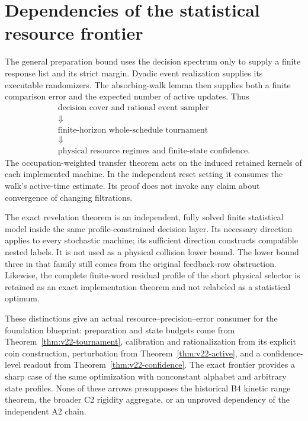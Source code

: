 \section{Dependencies of the statistical resource frontier}
\label{sec:v22-dependencies}
The general preparation bound uses the decision spectrum only to
supply a finite response list and its strict margin. Dyadic event
realization supplies its executable randomizers. The absorbing-walk
lemma then supplies both a finite comparison error and the expected
number of active updates. Thus
\[
 \begin{gathered}
 \text{decision cover and rational event sampler}\\
 \Downarrow\\
 \text{finite-horizon whole-schedule tournament}\\
 \Downarrow\\
 \text{physical resource regimes and finite-state confidence}.
 \end{gathered}
\]
The occupation-weighted transfer theorem acts on the induced retained
kernels of each implemented machine. In the independent reset setting
it consumes the walk's active-time estimate. Its proof does not invoke
any claim about convergence of changing filtrations.

The exact revelation theorem is an independent, fully solved finite
statistical model inside the same profile-constrained decision layer.
Its necessary direction applies to every stochastic machine; its
sufficient direction constructs compatible nested labels. It is not
used as a physical collision lower bound. The lower bound three in
that family still comes from the original feedback-row obstruction.
Likewise, the complete finite-word residual profile of the short
physical selector is retained as an exact implementation theorem and
not relabeled as a statistical optimum.

These distinctions give an actual resource--precision--error consumer
for the foundation blueprint: preparation and state budgets come from
Theorem~\ref{thm:v22-tournament}, calibration and rationalization from
its explicit coin construction, perturbation from
Theorem~\ref{thm:v22-active}, and a confidence-level readout from
Theorem~\ref{thm:v22-confidence}. The exact frontier provides a sharp
case of the same optimization with nonconstant alphabet and arbitrary
state profiles. None of these arrows presupposes the historical B4
kinetic range theorem, the broader C2 rigidity aggregate, or an
unproved dependency of the independent A2 chain.
